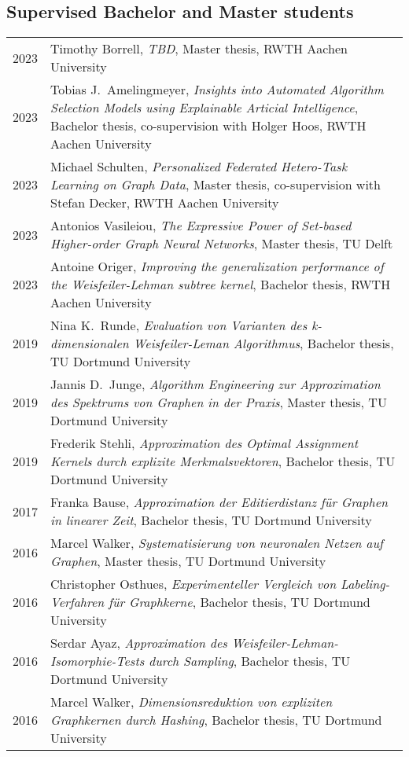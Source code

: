 \documentclass[11pt, a4paper, DIV=12]{scrartcl}
\begin{document}
\subsection*{Supervised Bachelor and Master students}
\begin{tabular}{p{2.1cm}p{12.0cm}}
	2023 & Timothy Borrell, \emph{TBD}, Master thesis, RWTH Aachen University\\
	2023 & Tobias J.\ Amelingmeyer, \emph{Insights into Automated Algorithm Selection Models using Explainable Articial Intelligence}, Bachelor thesis, co-supervision with Holger Hoos, RWTH Aachen University\\
	2023 & Michael Schulten, \emph{Personalized Federated Hetero-Task Learning on Graph Data}, Master thesis, co-supervision with Stefan Decker, RWTH Aachen University\\
	2023 & Antonios Vasileiou, \emph{The Expressive Power of Set-based Higher-order Graph Neural Networks}, Master thesis, TU Delft\\
	2023 & Antoine Origer, \emph{Improving the generalization performance of the Weisfeiler-Lehman subtree kernel}, Bachelor thesis, RWTH Aachen University\\
	2019 & Nina K.\ Runde, \emph{Evaluation von Varianten des k-dimensionalen Weisfeiler-Leman Algorithmus}, Bachelor thesis, TU Dortmund University\\
	2019 & Jannis D.\ Junge, \emph{Algorithm Engineering zur Approximation des Spektrums von Graphen in der Praxis}, Master thesis, TU Dortmund University\\
	2019 & Frederik Stehli, \emph{Approximation des Optimal Assignment Kernels durch explizite Merkmalsvektoren}, Bachelor thesis, TU Dortmund University\\
	2017 & Franka Bause, \emph{Approximation der Editierdistanz für Graphen in linearer Zeit}, Bachelor thesis, TU Dortmund University\\
	2016 & Marcel Walker, \emph{Systematisierung von neuronalen Netzen auf Graphen}, Master thesis, TU Dortmund University\\
	2016 & Christopher Osthues, \emph{Experimenteller Vergleich von Labeling-Verfahren für Graphkerne}, Bachelor thesis, TU Dortmund University\\
	2016 & Serdar Ayaz, \emph{Approximation des Weisfeiler-Lehman-Isomorphie-Tests durch Sampling}, Bachelor thesis, TU Dortmund University\\
	2016 & Marcel Walker, \emph{Dimensionsreduktion von expliziten Graphkernen durch Hashing}, Bachelor thesis, TU Dortmund University\\
\end{tabular}
\end{document}
